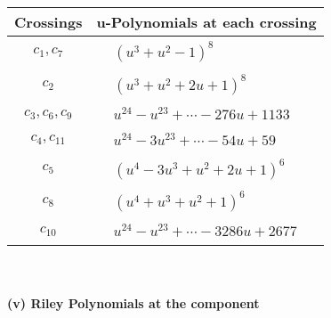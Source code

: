 \documentclass[1p]{elsarticle_modified}
\theoremstyle{definition}
\begin{document}
\begin{tabular}{m{50pt}|m{274pt}}
Crossings & \hspace{64pt}u-Polynomials at each crossing \\
\hline $$\begin{aligned}c_{1},c_{7}\end{aligned}$$&$\begin{aligned}
&(u^3+u^2-1)^8
\end{aligned}$\\
\hline $$\begin{aligned}c_{2}\end{aligned}$$&$\begin{aligned}
&(u^3+u^2+2 u+1)^8
\end{aligned}$\\
\hline $$\begin{aligned}c_{3},c_{6},c_{9}\end{aligned}$$&$\begin{aligned}
&u^{24}- u^{23}+\cdots-276 u+1133
\end{aligned}$\\
\hline $$\begin{aligned}c_{4},c_{11}\end{aligned}$$&$\begin{aligned}
&u^{24}-3 u^{23}+\cdots-54 u+59
\end{aligned}$\\
\hline $$\begin{aligned}c_{5}\end{aligned}$$&$\begin{aligned}
&(u^4-3 u^3+u^2+2 u+1)^6
\end{aligned}$\\
\hline $$\begin{aligned}c_{8}\end{aligned}$$&$\begin{aligned}
&(u^4+u^3+u^2+1)^6
\end{aligned}$\\
\hline $$\begin{aligned}c_{10}\end{aligned}$$&$\begin{aligned}
&u^{24}- u^{23}+\cdots-3286 u+2677
\end{aligned}$\\
\hline
\end{tabular}\\~\\
\newpage\renewcommand{\arraystretch}{1}
\flushleft \textbf{(v) Riley Polynomials at the component}\newline \\
\end{document}
